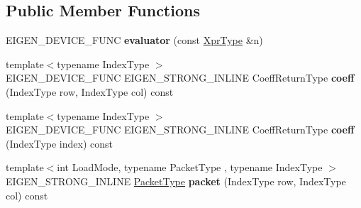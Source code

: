 \subsection*{Public Member Functions}
\begin{DoxyCompactItemize}
\item 
\mbox{\label{struct_eigen_1_1internal_1_1evaluator_3_01_cwise_nullary_op_3_01_nullary_op_00_01_plain_object_type_01_4_01_4_aaf586010a219c03f50009e770d6af28e}} 
E\+I\+G\+E\+N\+\_\+\+D\+E\+V\+I\+C\+E\+\_\+\+F\+U\+NC {\bfseries evaluator} (const \hyperlink{group___core___module_class_eigen_1_1_cwise_nullary_op}{Xpr\+Type} \&n)
\item 
\mbox{\label{struct_eigen_1_1internal_1_1evaluator_3_01_cwise_nullary_op_3_01_nullary_op_00_01_plain_object_type_01_4_01_4_aa8a593e05cf477e1c3e92f4e2975c46b}} 
{\footnotesize template$<$typename Index\+Type $>$ }\\E\+I\+G\+E\+N\+\_\+\+D\+E\+V\+I\+C\+E\+\_\+\+F\+U\+NC E\+I\+G\+E\+N\+\_\+\+S\+T\+R\+O\+N\+G\+\_\+\+I\+N\+L\+I\+NE Coeff\+Return\+Type {\bfseries coeff} (Index\+Type row, Index\+Type col) const
\item 
\mbox{\label{struct_eigen_1_1internal_1_1evaluator_3_01_cwise_nullary_op_3_01_nullary_op_00_01_plain_object_type_01_4_01_4_a7ec7e36414abf82667fe8c16f97ca204}} 
{\footnotesize template$<$typename Index\+Type $>$ }\\E\+I\+G\+E\+N\+\_\+\+D\+E\+V\+I\+C\+E\+\_\+\+F\+U\+NC E\+I\+G\+E\+N\+\_\+\+S\+T\+R\+O\+N\+G\+\_\+\+I\+N\+L\+I\+NE Coeff\+Return\+Type {\bfseries coeff} (Index\+Type index) const
\item 
\mbox{\label{struct_eigen_1_1internal_1_1evaluator_3_01_cwise_nullary_op_3_01_nullary_op_00_01_plain_object_type_01_4_01_4_af5154bf27bd13badf0674f8356068f9e}} 
{\footnotesize template$<$int Load\+Mode, typename Packet\+Type , typename Index\+Type $>$ }\\E\+I\+G\+E\+N\+\_\+\+S\+T\+R\+O\+N\+G\+\_\+\+I\+N\+L\+I\+NE \hyperlink{struct_eigen_1_1_packet_type}{Packet\+Type} {\bfseries packet} (Index\+Type row, Index\+Type col) const

\end{DoxyCompactItemize}
